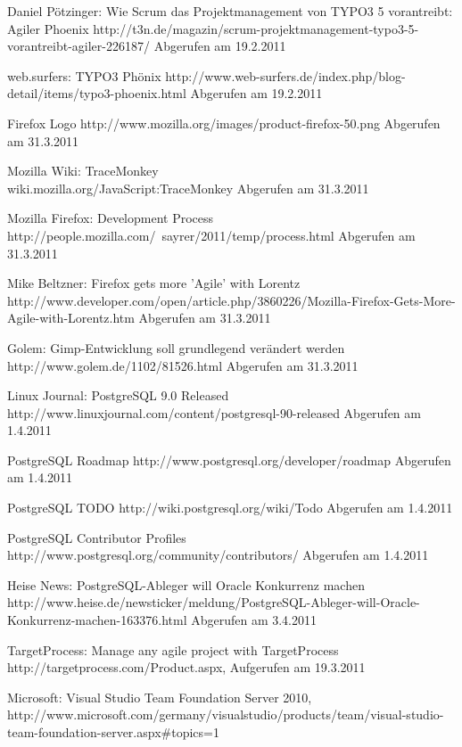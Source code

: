 \documentclass[german,english]{header}
\begin{document}
\begin{thebibliography}{5}
Daniel Pötzinger:
Wie Scrum das Projektmanagement von TYPO3 5 vorantreibt: Agiler Phoenix
http://t3n.de/magazin/scrum-projektmanagement-typo3-5-vorantreibt-agiler-226187/ Abgerufen am 19.2.2011

web.surfers:
TYPO3 Phönix
http://www.web-surfers.de/index.php/blog-detail/items/typo3-phoenix.html Abgerufen am 19.2.2011

Firefox Logo
http://www.mozilla.org/images/product-firefox-50.png Abgerufen am 31.3.2011


Mozilla Wiki:
TraceMonkey
\\wiki.mozilla.org/JavaScript:TraceMonkey Abgerufen am 31.3.2011

Mozilla Firefox: Development Process
http://people.mozilla.com/~sayrer/2011/temp/process.html Abgerufen am 31.3.2011

Mike Beltzner:
Firefox gets more 'Agile' with Lorentz
\\http://www.developer.com/open/article.php/3860226/Mozilla-Firefox-Gets-More-Agile-with-Lorentz.htm Abgerufen am 31.3.2011

Golem: Gimp-Entwicklung soll grundlegend verändert werden
http://www.golem.de/1102/81526.html Abgerufen am 31.3.2011

Linux Journal:
PostgreSQL 9.0 Released
http://www.linuxjournal.com/content/postgresql-90-released Abgerufen am 1.4.2011

PostgreSQL Roadmap
http://www.postgresql.org/developer/roadmap Abgerufen am 1.4.2011

PostgreSQL TODO
http://wiki.postgresql.org/wiki/Todo Abgerufen am 1.4.2011

PostgreSQL Contributor Profiles
http://www.postgresql.org/community/contributors/ Abgerufen am 1.4.2011

Heise News:
PostgreSQL-Ableger will Oracle Konkurrenz machen
http://www.heise.de/newsticker/meldung/PostgreSQL-Ableger-will-Oracle-Konkurrenz-machen-163376.html Abgerufen am 3.4.2011

TargetProcess: Manage any agile project with TargetProcess\\
http://targetprocess.com/Product.aspx,
Aufgerufen am 19.3.2011

Microsoft:
Visual Studio Team Foundation Server 2010,
http://www.microsoft.com/germany/visualstudio/products/team/visual-studio-team-foundation-server.aspx\#topics=1


\end{thebibliography}
\end{document}
